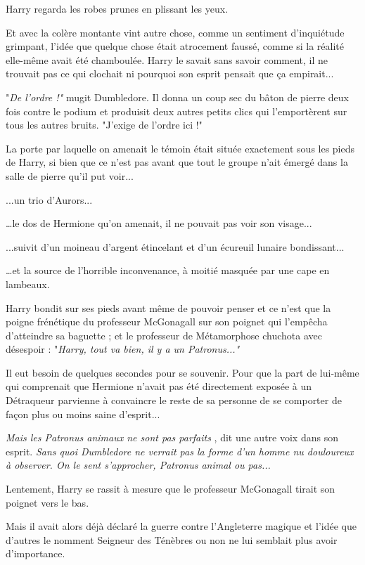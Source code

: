 Harry regarda les robes prunes en plissant les yeux.

Et avec la colère montante vint autre chose, comme un sentiment d'inquiétude grimpant, l'idée que quelque chose était atrocement faussé, comme si la réalité elle-même avait été chamboulée. Harry le savait sans savoir comment, il ne trouvait pas ce qui clochait ni pourquoi son esprit pensait que ça empirait...

"\emph{De l'ordre !"}  mugit Dumbledore. Il donna un coup sec du bâton de pierre deux fois contre le podium et produisit deux autres petits clics qui l'emportèrent sur tous les autres bruits. "J'exige de l'ordre ici !"

La porte par laquelle on amenait le témoin était située exactement sous les pieds de Harry, si bien que ce n'est pas avant que tout le groupe n'ait émergé dans la salle de pierre qu'il put voir...

...un trio d'Aurors...

…le dos de Hermione qu'on amenait, il ne pouvait pas voir son visage...

...suivit d'un moineau d'argent étincelant et d'un écureuil lunaire bondissant...

…et la source de l'horrible inconvenance, à moitié masquée par une cape en lambeaux.

Harry bondit sur ses pieds avant même de pouvoir penser et ce n'est que la poigne frénétique du professeur McGonagall sur son poignet qui l'empêcha d'atteindre sa baguette ; et le professeur de Métamorphose chuchota avec désespoir : "\emph{Harry, tout va bien, il y a un Patronus..."} 

Il eut besoin de quelques secondes pour se souvenir. Pour que la part de lui-même qui comprenait que Hermione n'avait pas été directement exposée à un Détraqueur parvienne à convaincre le reste de sa personne de se comporter de façon plus ou moins saine d'esprit...

\emph{Mais les Patronus animaux ne sont pas parfaits} , dit une autre voix dans son esprit. \emph{Sans quoi Dumbledore ne verrait pas la forme d'un homme nu douloureux à observer. On le sent s'approcher, Patronus animal ou pas...} 

Lentement, Harry se rassit à mesure que le professeur McGonagall tirait son poignet vers le bas.

Mais il avait alors déjà déclaré la guerre contre l'Angleterre magique et l'idée que d'autres le nomment Seigneur des Ténèbres ou non ne lui semblait plus avoir d'importance.

